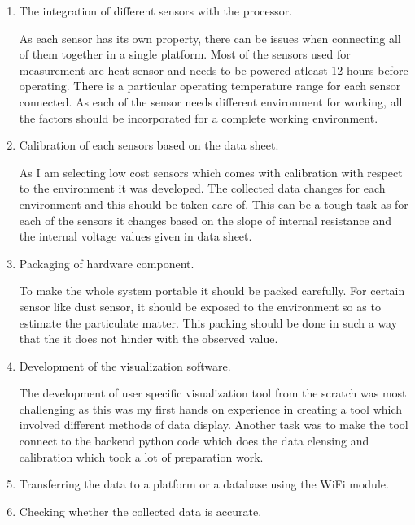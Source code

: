 \begin{enumerate}


\item The integration of different sensors with the processor.
\par
As each sensor has its own property, there can be issues when connecting all of them together in a single platform. Most of the sensors used for measurement are heat sensor and needs to be powered atleast 12 hours before operating. There is a particular operating temperature range for each sensor  connected. As each of the sensor needs different environment for working, all the factors should be incorporated for a complete working environment.



\item Calibration of each sensors based on the data sheet.
\par
As I am selecting low cost sensors which comes with calibration with respect to the environment it was developed. The collected data changes for each environment and this should be taken care of. This can be a tough task as for each of the sensors it changes based on the slope of internal resistance and the internal voltage values given in data sheet. 


\item Packaging of hardware component.
\par
To make the whole system portable it should be packed carefully. For certain sensor like dust sensor, it should be exposed to the environment so as to estimate the particulate matter. This packing should be done in such a way that the it does not hinder with the observed value.

\item Development of the visualization software.
\par The development of user specific visualization tool from the scratch was most challenging as this was my first hands on experience in creating a tool which involved different methods of data display. Another task was to make the tool connect to the backend python code which does the data clensing and calibration which took a lot of preparation work.

\item Transferring the data to a platform or a database using the WiFi module.

\item Checking whether the collected data is accurate.


\end{enumerate}

